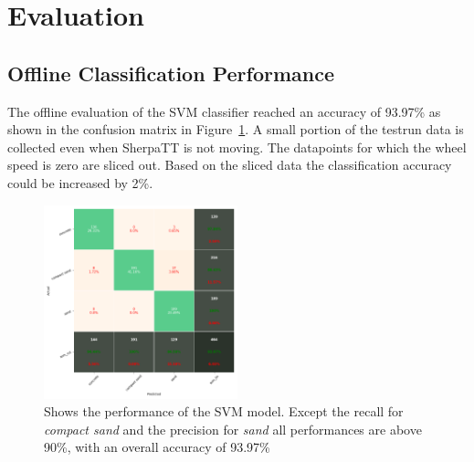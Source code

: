 \documentclass{article}
\begin{document}
\section{Evaluation}
\subsection{Offline Classification Performance}

The offline evaluation of the SVM classifier reached an accuracy of 93.97\% as shown in the confusion matrix in Figure~\ref{fig:confusionmatrix}. A small portion of the testrun data is collected even when SherpaTT is not moving. The datapoints for which the wheel speed is zero are sliced out. Based on the sliced data  the classification accuracy could be increased by 2\%.

\begin{figure}[h]
\centering
\includegraphics[width=0.5\textwidth]{../figures/confusionmatrix_Train.png}
\caption{\label{fig:confusionmatrix} Shows the performance of the SVM model. Except the recall for \emph{compact sand} and the precision for \emph{sand} all performances are above 90\%, with an overall accuracy of 93.97\%}
\end{figure}
\end{document}

